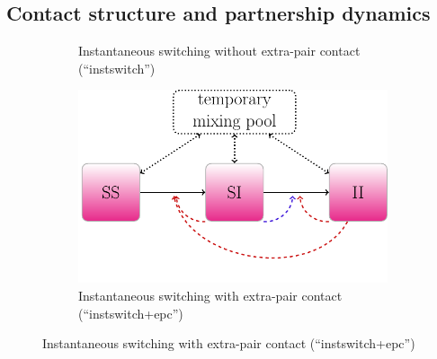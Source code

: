 \documentclass[10pt,letterpaper]{article}
\begin{document}
\subsection*{Contact structure and partnership dynamics}

\begin{figure}[t!p]

\begin{subfigure}[b]{0.4\linewidth}
	\centering
\caption{Instantaneous switching without extra-pair contact (``instswitch'')}
\end{subfigure}
\begin{subfigure}[b]{0.4\linewidth}
	\centering
	  \includegraphics[width=0.9\linewidth]{../figures/tikz-f2}
\caption{Instantaneous switching with extra-pair contact (``instswitch+epc'')}
\end{subfigure}


\end{figure}
\end{document}
